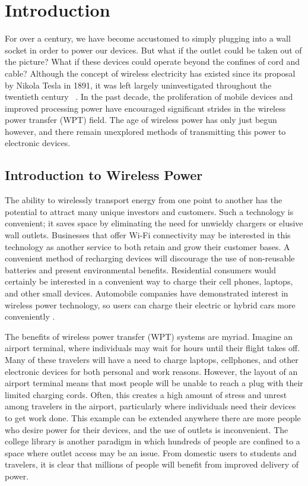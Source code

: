 \chapter{Introduction}
\label{ch:introduction}

For over a century, we have become accustomed to simply plugging into a wall socket in order to power our devices. But what if the outlet could be taken out of the picture? What if these devices could operate beyond the confines of cord and cable? Although the concept of wireless electricity has existed since its proposal by Nikola Tesla in 1891, it was left largely uninvestigated throughout the twentieth century ~\cite{NikkiT}. In the past decade, the proliferation of mobile devices and improved processing power have encouraged significant strides in the wireless power transfer (WPT) field. The age of wireless power has only just begun however, and there remain unexplored methods of transmitting this power to electronic devices.

\section{Introduction to Wireless Power}
The ability to wirelessly transport energy from one point to another has the potential to attract many unique investors and customers. Such a technology is convenient; it saves space by eliminating the need for unwieldy chargers or elusive wall outlets. Businesses that offer Wi-Fi connectivity may be interested in this technology as another service to both retain and grow their customer bases. A convenient method of recharging devices will discourage the use of non-reusable batteries and present environmental benefits. Residential consumers would certainly be interested in a convenient way to charge their cell phones, laptops, and other small devices. Automobile companies have demonstrated interest in wireless power technology, so users can charge their electric or hybrid cars more conveniently \cite{ToyotaNews}\cite{VolvoNews}.

The benefits of wireless power transfer (WPT) systems are myriad. Imagine an airport terminal, where individuals may wait for hours until their flight takes off. Many of these travelers will have a need to charge laptops, cellphones, and other electronic devices for both personal and work reasons. However, the layout of an airport terminal means that most people will be unable to reach a plug with their limited charging cords. Often, this creates a high amount of stress and unrest among travelers in the airport, particularly where individuals need their devices to get work done. This example can be extended anywhere there are more people who desire power for their devices, and the use of outlets is inconvenient. The college library is another paradigm in which hundreds of people are confined to a space where outlet access may be an issue. From domestic users to students and travelers, it is clear that millions of people will benefit from improved delivery of power.

